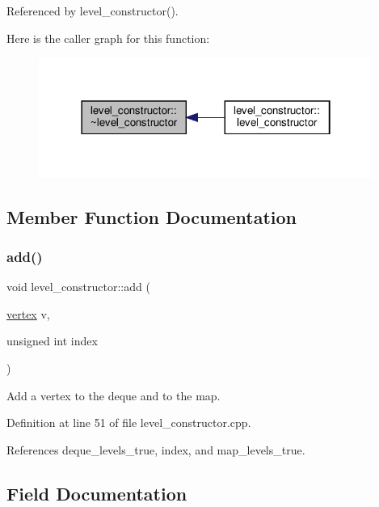 Referenced by level\+\_\+constructor().

Here is the caller graph for this function\+:
\nopagebreak
\begin{figure}[H]
\begin{center}
\leavevmode
\includegraphics[width=310pt]{dd/d07/classlevel__constructor_aa52e6e3db284b6d0ca193cf60afb0aae_icgraph}
\end{center}
\end{figure}


\subsection{Member Function Documentation}
\mbox{\label{classlevel__constructor_a5924f498057639989eab3c8be3e562de}} 
\subsubsection{\texorpdfstring{add()}{add()}}
{\footnotesize\ttfamily void level\+\_\+constructor\+::add (\begin{DoxyParamCaption}\item[{\hyperlink{graph_8hpp_abefdcf0544e601805af44eca032cca14}{vertex}}]{v,  }\item[{unsigned int}]{index }\end{DoxyParamCaption})}



Add a vertex to the deque and to the map. 



Definition at line 51 of file level\+\_\+constructor.\+cpp.



References deque\+\_\+levels\+\_\+true, index, and map\+\_\+levels\+\_\+true.



\subsection{Field Documentation}
\mbox{\label{classlevel__constructor_affe9e77ba54da74f81ae087c4ec7442b}} 

